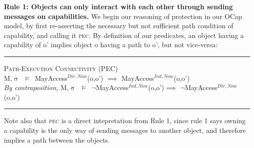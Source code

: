 \documentclass[a4paper,11pt, twoside,twocolumn]{article}
\newenvironment{logic}[1][]
{\begin{flushleft} \small }
{\end{flushleft}}
\newcommand{\loimplies}{$\implies$}
\newcommand{\losigma}{$\upsigma$}
\newcommand{\loturns} {$\vDash$}
\newcommand{\loneg}{$\boldsymbol \neg$}
\newcommand{\ablock} {\null\qquad}
\begin{document}
\textbf{Rule 1: Objects can only interact with each other through sending messages on capabilities.}
We begin our reasoning of protection in our OCap model, by first re-asserting the necessary but not sufficient path condition of capability, and calling it \textsc{pec}. By definition of our predicates, an object having a capability of o' implies object o having a path to o', but not vice-versa:
\begin{logic}
\hrule\null
\textsc{\normalsize *Path-Execution Connectivity (PEC)}\\
M,\losigma\ \loturns\ MayAccess$^{Dir,Now}$(o,o') \loimplies \linebreak
\ablock \ablock  MayAccess$^{Ind,Now}$(o,o')
\linebreak \\
\textit{By contraposition,}\linebreak
M,\losigma\ \loturns\ \loneg MayAccess$^{Ind,Now}$(o,o')\loimplies \linebreak
\ablock \ablock \loneg MayAccess$^{Dir,Now}$(o,o')
\linebreak
\hrule
\end{logic}
Note also that \textsc{pec} is a direct intepretation from Rule 1, since rule 1 says owning a capability is the only way of sending messages to another object, and therefore implies a path between the objects.\\
\end{document}
